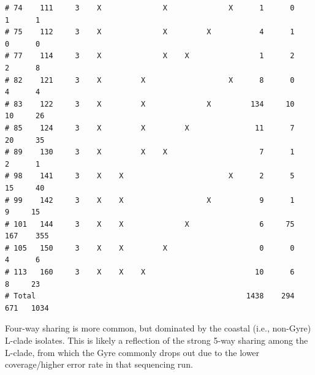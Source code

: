 \documentclass{article}\usepackage[]{graphicx}\usepackage[]{color}
\makeatletter
\newenvironment{kframe}{%
 \def\at@end@of@kframe{}%
 \ifinner\ifhmode%
  \def\at@end@of@kframe{\end{minipage}}%
  \begin{minipage}{\columnwidth}%
 \fi\fi%
 \def\FrameCommand##1{\hskip\@totalleftmargin \hskip-\fboxsep
 \colorbox{shadecolor}{##1}\hskip-\fboxsep
     \hskip-\linewidth \hskip-\@totalleftmargin \hskip\columnwidth}%
 \MakeFramed {\advance\hsize-\width
   \@totalleftmargin\z@ \linewidth\hsize
   \@setminipage}}%
 {\par\unskip\endMakeFramed%
 \at@end@of@kframe}
\newenvironment{knitrout}{}{} %
\makeatother
\begin{document}
\begin{knitrout}
\begin{kframe}
\begin{verbatim}
# 74    111     3    X              X              X      1      0      1      1
# 75    112     3    X              X         X           4      1      0      0
# 77    114     3    X              X    X                1      2      2      8
# 82    121     3    X         X                   X      8      0      4      4
# 83    122     3    X         X              X         134     10     10     26
# 85    124     3    X         X         X               11      7     20     35
# 89    130     3    X         X    X                     7      1      2      1
# 98    141     3    X    X                        X      2      5     15     40
# 99    142     3    X    X                   X           9      1      9     15
# 101   144     3    X    X              X                6     75    167    355
# 105   150     3    X    X         X                     0      0      4      6
# 113   160     3    X    X    X                         10      6      8     23
# Total                                                1438    294    671   1034
\end{verbatim}
\end{kframe}
\end{knitrout}

Four-way sharing is more common, but dominated by the coastal (i.e., non-Gyre) L-clade isolates.  This is likely a
reflection of the strong 5-way sharing among the L-clade, from which the Gyre commonly drops out due to the lower
coverage/higher error rate in that sequencing run.
\end{document}
